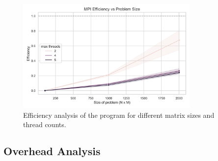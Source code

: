 \documentclass[12pt]{article}
\begin{document}
\begin{figure}[h!]
	\centering
	\includegraphics[width=0.8\textwidth]{mpi_efficiency.png}
	\caption{Efficiency analysis of the program for different matrix sizes and thread counts.}
	\label{fig:efficiency_plot}
\end{figure}

\subsection{Overhead Analysis}
\end{document}
